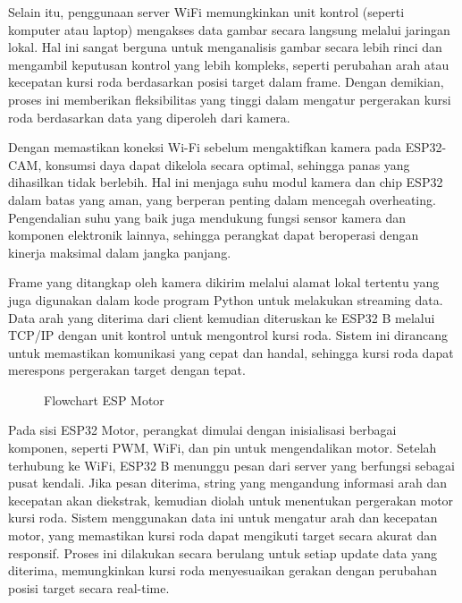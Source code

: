 Selain itu, penggunaan server WiFi memungkinkan unit kontrol (seperti komputer atau laptop) mengakses data gambar secara langsung melalui jaringan lokal. Hal ini sangat berguna untuk menganalisis gambar secara lebih rinci dan mengambil keputusan kontrol yang lebih kompleks, seperti perubahan arah atau kecepatan kursi roda berdasarkan posisi target dalam frame. Dengan demikian, proses ini memberikan fleksibilitas yang tinggi dalam mengatur pergerakan kursi roda berdasarkan data yang diperoleh dari kamera.

Dengan memastikan koneksi Wi-Fi sebelum mengaktifkan kamera pada ESP32-CAM, konsumsi daya dapat dikelola secara optimal, sehingga panas yang dihasilkan tidak berlebih. Hal ini menjaga suhu modul kamera dan chip ESP32 dalam batas yang aman, yang berperan penting dalam mencegah overheating. Pengendalian suhu yang baik juga mendukung fungsi sensor kamera dan komponen elektronik lainnya, sehingga perangkat dapat beroperasi dengan kinerja maksimal dalam jangka panjang.

Frame yang ditangkap oleh kamera dikirim melalui alamat lokal tertentu yang juga digunakan dalam kode program Python untuk melakukan streaming data. Data arah yang diterima dari client kemudian diteruskan ke ESP32 B melalui TCP/IP dengan unit kontrol untuk mengontrol kursi roda. Sistem ini dirancang untuk memastikan komunikasi yang cepat dan handal, sehingga kursi roda dapat merespons pergerakan target dengan tepat.

\begin{figure}[H]
  \centering
  \resizebox{0.7\linewidth}{!}{
    
  }
  \caption{Flowchart ESP Motor}
\end{figure}

Pada sisi ESP32 Motor, perangkat dimulai dengan inisialisasi berbagai komponen, seperti PWM, WiFi, dan pin untuk mengendalikan motor. Setelah terhubung ke WiFi, ESP32 B menunggu pesan dari server yang berfungsi sebagai pusat kendali. Jika pesan diterima, string yang mengandung informasi arah dan kecepatan akan diekstrak, kemudian diolah untuk menentukan pergerakan motor kursi roda. Sistem menggunakan data ini untuk mengatur arah dan kecepatan motor, yang memastikan kursi roda dapat mengikuti target secara akurat dan responsif. Proses ini dilakukan secara berulang untuk setiap update data yang diterima, memungkinkan kursi roda menyesuaikan gerakan dengan perubahan posisi target secara real-time.
